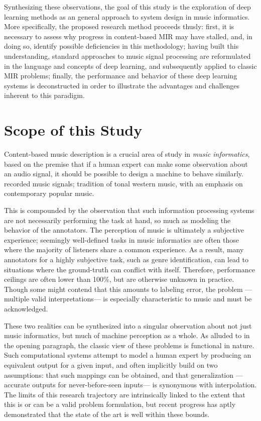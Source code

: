 Synthesizing these observations, the goal of this study is the exploration of deep learning methods as an general approach to system design in music informatics.
More specifically, the proposed research method proceeds thusly:
first, it is necessary to assess why progress in content-based MIR may have stalled, and, in doing so, identify possible deficiencies in this methodology;
having built this understanding, standard approaches to music signal processing are reformulated in the language and concepts of deep learning, and subsequently applied to classic MIR problems;
finally, the performance and behavior of these deep learning systems is deconstructed in order to illustrate the advantages and challenges inherent to this paradigm.


\section{Scope of this Study}
\label{sec:scope}

Content-based music description is a crucial area of study in \emph{music informatics}, based on the premise that if a human expert can make some observation about an audio signal, it should be possible to design a machine to behave similarly.
recorded music signals;
tradition of tonal western music, with an emphasis on contemporary popular music.

This is compounded by the observation that such information processing systems are not necessarily performing the task at hand, so much as modeling the behavior of the annotators.
The perception of music is ultimately a subjective experience; seemingly well-defined tasks in music informatics are often those where the majority of listeners share a common experience.
As a result, many annotators for a highly subjective task, such as genre identification, can lead to situations where the ground-truth can conflict with itself.
Therefore, performance ceilings are often lower than 100\%, but are otherwise unknown in practice.
Though some might contend that this amounts to labeling error, the problem ---multiple valid interpretations--- is especially characteristic to music and must be acknowledged.

These two realities can be synthesized into a singular observation about not just music informatics, but much of machine perception as a whole.
As alluded to in the opening paragraph, the classic view of these problems is functional in nature.
Such computational systems attempt to model a human expert by producing an equivalent output for a given input, and often implicitly build on two assumptions: that such mappings can be obtained, and that generalization ---accurate outputs for never-before-seen inputs--- is synonymous with interpolation.
The limits of this research trajectory are intrinsically linked to the extent that this is or can be a valid problem formulation, but recent progress has aptly demonstrated that the state of the art is well within these bounds.




